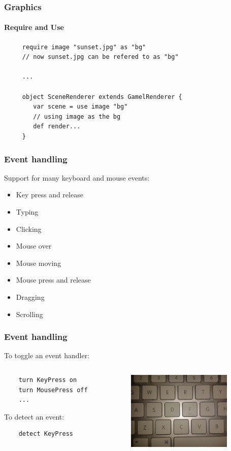 \documentclass{beamer}
\begin{document}
\begin{frame}[fragile]
    \frametitle{Graphics}
    \framesubtitle{Require and Use}
    \begin{lstlisting}
     require image "sunset.jpg" as "bg"
     // now sunset.jpg can be refered to as "bg"

     ...

     object SceneRenderer extends GamelRenderer {
        var scene = use image "bg"
        // using image as the bg
        def render...
     }
    \end{lstlisting}
\end{frame}

\begin{frame}
    \frametitle{Event handling}
    Support for many keyboard and mouse events:
    \begin{multicols}{2}
    \begin{itemize}[<+->]
        \item{Key press and release}
        \item{Typing}
        \item{Clicking}
        \item{Mouse over}
        \item{Mouse moving}
        \item{Mouse press and release}
        \item{Dragging}
        \item{Scrolling}
    \end{itemize}
    \end{multicols}
\end{frame}

\begin{frame}[fragile]
    \frametitle{Event handling}
    To toggle an event handler:
    \begin{columns}[T]
    \begin{column}[T]{5cm}
    \begin{lstlisting}
    turn KeyPress on
    turn MousePress off
    ...
    \end{lstlisting}

    To detect an event:
    \begin{lstlisting}
    detect KeyPress
    \end{lstlisting}
    \end{column}
    \begin{column}[T]{5cm}
    \includegraphics[width=5cm]{keyboard}
    \end{column}
    \end{columns}
\end{frame}
\end{document}
